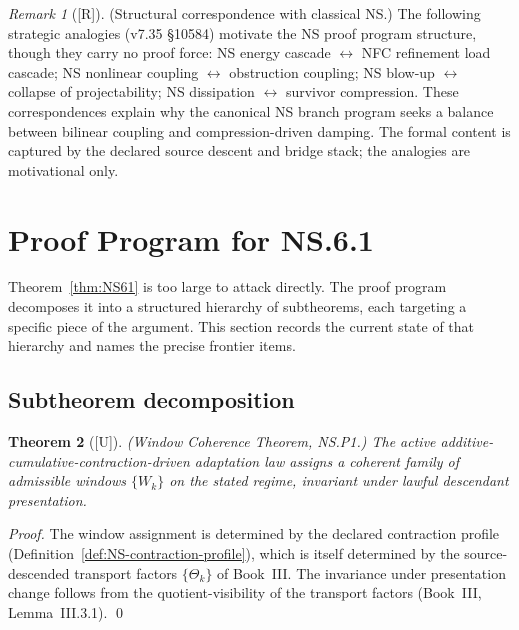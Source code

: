 \documentclass[12pt,oneside]{amsbook}
\theoremstyle{plain}
\newtheorem{theorem}{Theorem}[section]
\theoremstyle{definition}
\theoremstyle{remark}
\newtheorem{remark}[theorem]{Remark}
\newcommand{\status}[1]{\textup{[#1]}}
\begin{document}
\begin{remark}[\status{R}]
\textup{(Structural correspondence with classical NS.)}
The following strategic analogies (v7.35 \S10584) motivate the NS
proof program structure, though they carry no proof force:
NS energy cascade $\leftrightarrow$ NFC refinement load cascade;
NS nonlinear coupling $\leftrightarrow$ obstruction coupling;
NS blow-up $\leftrightarrow$ collapse of projectability;
NS dissipation $\leftrightarrow$ survivor compression.
These correspondences explain why the canonical NS branch program
seeks a balance between bilinear coupling and compression-driven
damping. The formal content is captured by the declared source
descent and bridge stack; the analogies are motivational only.
\end{remark}


\section{Proof Program for NS.6.1}
\label{sec:proof-program}

Theorem~\ref{thm:NS61} is too large to attack directly. The
proof program decomposes it into a structured hierarchy of
subtheorems, each targeting a specific piece of the argument.
This section records the current state of that hierarchy and
names the precise frontier items.

\subsection{Subtheorem decomposition}

\begin{theorem}[\status{U}]\label{thm:NSP1}
\textup{(Window Coherence Theorem, NS.P1.)} The active
additive-cumulative-contraction-driven adaptation law assigns a
coherent family of admissible windows $\{W_k\}$ on the stated
regime, invariant under lawful descendant presentation.
\end{theorem}

\begin{proof}
The window assignment is determined by the declared contraction
profile (Definition~\ref{def:NS-contraction-profile}), which is
itself determined by the source-descended transport factors
$\{\Theta_k\}$ of Book~III. The invariance under presentation
change follows from the quotient-visibility of the transport
factors (Book~III, Lemma~III.3.1).
\qed
\end{proof}
\end{document}
